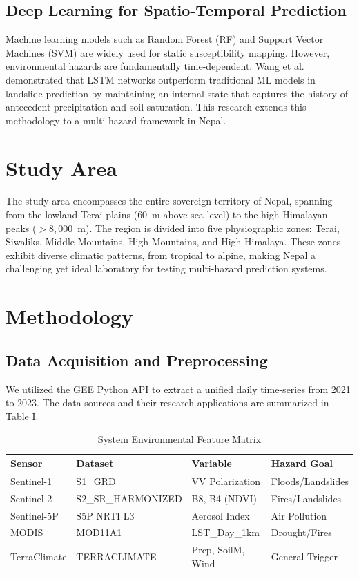 \documentclass[journal,twoside]{IEEEtran}
\begin{document}
\subsection{Deep Learning for Spatio-Temporal Prediction}
Machine learning models such as Random Forest (RF) and Support Vector Machines (SVM) are widely used for static susceptibility mapping. However, environmental hazards are fundamentally time-dependent. Wang et al. \cite{wang2019lstm} demonstrated that LSTM networks outperform traditional ML models in landslide prediction by maintaining an internal state that captures the history of antecedent precipitation and soil saturation. This research extends this methodology to a multi-hazard framework in Nepal.

\section{Study Area}
The study area encompasses the entire sovereign territory of Nepal, spanning from the lowland Terai plains ($60$~m above sea level) to the high Himalayan peaks ($>8,000$~m). The region is divided into five physiographic zones: Terai, Siwaliks, Middle Mountains, High Mountains, and High Himalaya. These zones exhibit diverse climatic patterns, from tropical to alpine, making Nepal a challenging yet ideal laboratory for testing multi-hazard prediction systems.

\section{Methodology}

\subsection{Data Acquisition and Preprocessing}
We utilized the GEE Python API to extract a unified daily time-series from 2021 to 2023. The data sources and their research applications are summarized in Table I.

\begin{table}[h!]
\centering
\caption{System Environmental Feature Matrix}
\begin{tabular}{l l l l}
\toprule
\textbf{Sensor} & \textbf{Dataset} & \textbf{Variable} & \textbf{Hazard Goal} \\
\midrule
Sentinel-1 & S1\_GRD & VV Polarization & Floods/Landslides \\
Sentinel-2 & S2\_SR\_HARMONIZED & B8, B4 (NDVI) & Fires/Landslides \\
Sentinel-5P & S5P NRTI L3 & Aerosol Index & Air Pollution \\
MODIS & MOD11A1 & LST\_Day\_1km & Drought/Fires \\
TerraClimate & TERRACLIMATE & Prcp, SoilM, Wind & General Trigger \\
\bottomrule
\end{tabular}
\end{table}
\end{document}
